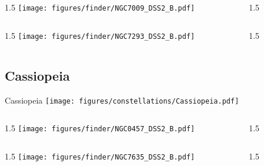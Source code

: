 \documentclass[final]{beamer}
\newlength{\colwidth}
\begin{document}

\begin{frame}[t]{}
  \begin{columns}[T]
    \begin{column}{1.5\colwidth}
      \centering
      \texttt{[image: figures/finder/NGC7009\_DSS2\_B.pdf]}
    \end{column}
    \begin{column}{1.5\colwidth}
      \Large
      
    \end{column}
  \end{columns}
  \vspace{\fill}
  \begin{columns}[T]
    \begin{column}{1.5\colwidth}
      \centering
      \texttt{[image: figures/finder/NGC7293\_DSS2\_B.pdf]}
    \end{column}
    \begin{column}{1.5\colwidth}
      \Large
      
    \end{column}
  \end{columns}
\end{frame}

\subsection{Cassiopeia}

\begin{frame}[t]{\LARGE Cassiopeia}
  \centering
  \texttt{[image: figures/constellations/Cassiopeia.pdf]}
\end{frame}


\begin{frame}[t]{}
  \begin{columns}[T]
    \begin{column}{1.5\colwidth}
      \centering
      \texttt{[image: figures/finder/NGC0457\_DSS2\_B.pdf]}
    \end{column}
    \begin{column}{1.5\colwidth}
      \Large
      
    \end{column}
  \end{columns}
  \vspace{\fill}
  \begin{columns}[T]
    \begin{column}{1.5\colwidth}
      \centering
      \texttt{[image: figures/finder/NGC7635\_DSS2\_B.pdf]}
    \end{column}
    \begin{column}{1.5\colwidth}
      \Large
      
    \end{column}
  \end{columns}
\end{frame}
\end{document}
